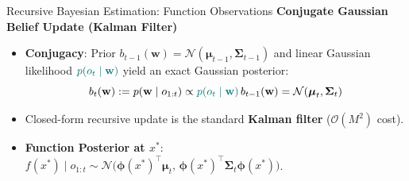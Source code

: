 \documentclass[18pt,aspectratio=149]{beamer}
\begin{document}
\begin{frame}{Recursive Bayesian Estimation: Function Observations}
    \textbf{Conjugate Gaussian Belief Update (Kalman Filter)}
    \begin{itemize}
        \item \textbf{Conjugacy}: Prior $b_{t-1}(\mathbf{w}) = \mathcal{N}(\boldsymbol{\mu}_{t-1}, \boldsymbol{\Sigma}_{t-1})$ and linear Gaussian likelihood $\textcolor{teal!90!black}{p(o_t \mid \mathbf{w})}$ yield an exact Gaussian posterior:
        \vspace{-0.5em}
        \[
            b_t(\mathbf{w}) := p(\mathbf{w} \mid o_{1:t}) \propto \textcolor{teal!90!black}{p(o_t \mid \mathbf{w})} \, b_{t-1}(\mathbf{w}) = \mathcal{N}(\boldsymbol{\mu}_t, \boldsymbol{\Sigma}_t)
        \]
        \vspace{-1.8em}
        \item Closed-form recursive update is the standard \textbf{Kalman filter} ($\mathcal{O}(M^2)$ cost).
        \item \textbf{Function Posterior at $x^*$}: $f(x^*) \mid o_{1:t} \sim \mathcal{N}\big(\boldsymbol{\phi}(x^*)^\top \boldsymbol{\mu}_t, \, \boldsymbol{\phi}(x^*)^\top \boldsymbol{\Sigma}_t \boldsymbol{\phi}(x^*)\big)$.
    \end{itemize}
\end{frame}
\end{document}
